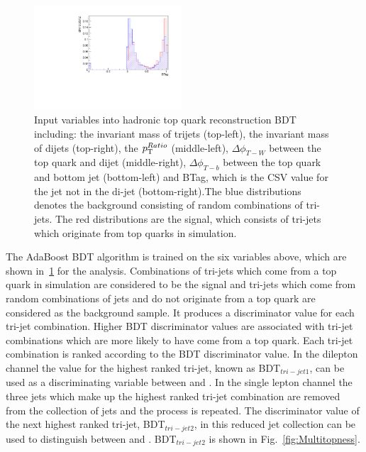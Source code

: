 \begin{figure}[ht!]
     \includegraphics[width=0.49\textwidth]{images/Run1/BTag.pdf}          
    \caption{Input variables into hadronic top quark reconstruction BDT including: the invariant mass of trijets (top-left), the invariant mass of dijets (top-right), the $p_{\mathrm{T}}^{Ratio}$ (middle-left), $\Delta\phi_{T-W}$ between the top quark and dijet (middle-right), $\Delta\phi_{T-b}$ between the top quark and bottom jet (bottom-left) and BTag, which is the CSV value for the jet not in the di-jet (bottom-right).The blue distributions denotes the background consisting of random combinations of tri-jets. The red distributions are the signal, which consists of tri-jets which originate from top quarks in simulation.}
    \label{fig:TopBDTinput}
\end{figure}

The AdaBoost BDT algorithm is trained on the six variables above, which are shown in~\ref{fig:TopBDTinput} for the \runone analysis. Combinations of tri-jets which come from a top quark in simulation are considered to be the signal and tri-jets which come from random combinations of jets and do not originate from a top quark are considered as the background sample. It produces a discriminator value for each tri-jet combination. Higher BDT discriminator values are associated with tri-jet combinations which are more likely to have come from a top quark. Each tri-jet combination is ranked according to the BDT discriminator value. In the dilepton channel the value for the highest ranked tri-jet, known as BDT$_{tri-jet1}$, can be used as a discriminating variable between \tttt and \ttbar. In the single lepton channel the three jets which make up the highest ranked tri-jet combination are removed from the collection of jets and the process is repeated. The discriminator value of the next highest ranked tri-jet, BDT$_{tri-jet2}$, in this reduced jet collection can be used to distinguish between \tttt and \ttbar. BDT$_{tri-jet2}$ is shown in Fig.~\ref{fig:Multitopness}.


